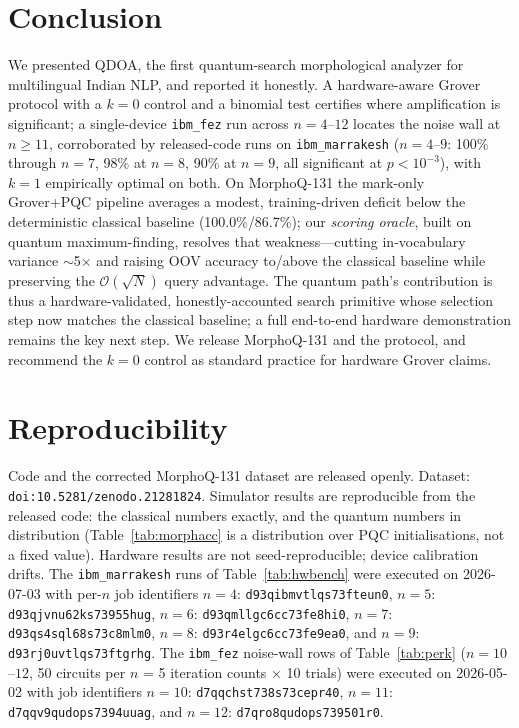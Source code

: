 \documentclass[journal]{IEEEtran}
\newcommand{\bigO}{\mathcal{O}}
\newcommand{\sqrtN}{\sqrt{N}}
\begin{document}
\section{Conclusion}
We presented QDOA, the first quantum-search morphological analyzer for
multilingual Indian NLP, and reported it honestly. A hardware-aware Grover
protocol with a $k{=}0$ control and a binomial test certifies where amplification
is significant; a single-device \texttt{ibm\_fez} run across $n{=}4$--$12$ locates
the noise wall at $n\!\ge\!11$, corroborated by released-code runs on
\texttt{ibm\_marrakesh} ($n{=}4$--$9$: 100\% through $n{=}7$, 98\% at $n{=}8$,
90\% at $n{=}9$, all significant at $p<10^{-3}$), with $k{=}1$ empirically optimal
on both. On MorphoQ-131 the mark-only Grover+PQC pipeline averages a modest,
training-driven deficit below the deterministic classical baseline
(100.0\%/86.7\%); our \emph{scoring oracle}, built on quantum maximum-finding,
resolves that weakness---cutting in-vocabulary variance $\sim$5$\times$ and
raising OOV accuracy to/above the classical baseline while preserving the
$\bigO(\sqrtN)$ query advantage. The quantum path's contribution is thus a
hardware-validated, honestly-accounted search primitive whose selection step now
matches the classical baseline; a full end-to-end hardware demonstration remains
the key next step. We release MorphoQ-131 and the protocol, and recommend the
$k{=}0$ control as standard practice for hardware Grover claims.

\section*{Reproducibility}
Code and the corrected MorphoQ-131 dataset are released openly.
Dataset: \texttt{doi:10.5281/zenodo.21281824}. %
Simulator results are reproducible from the released code: the classical numbers
exactly, and the quantum numbers in distribution (Table~\ref{tab:morphacc} is a
distribution over PQC initialisations, not a fixed value). Hardware results are
not seed-reproducible; device calibration drifts.
The \texttt{ibm\_marrakesh} runs of Table~\ref{tab:hwbench} were executed on
2026-07-03 with per-$n$ job identifiers $n{=}4$: \texttt{d93qibmvtlqs73fteun0},
$n{=}5$: \texttt{d93qjvnu62ks73955hug}, $n{=}6$: \texttt{d93qmllgc6cc73fe8hi0},
$n{=}7$: \texttt{d93qs4sql68s73c8mlm0}, $n{=}8$: \texttt{d93r4elgc6cc73fe9ea0},
and $n{=}9$: \texttt{d93rj0uvtlqs73ftgrhg}.
The \texttt{ibm\_fez} noise-wall rows of Table~\ref{tab:perk} ($n{=}10$--$12$,
50 circuits per $n$ = 5 iteration counts $\times$ 10 trials) were executed on
2026-05-02 with job identifiers $n{=}10$: \texttt{d7qqchst738s73cepr40},
$n{=}11$: \texttt{d7qqv9qudops7394uuag}, and
$n{=}12$: \texttt{d7qro8qudops739501r0}.
\end{document}
